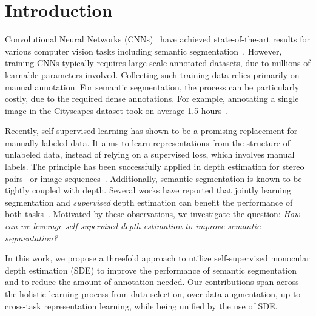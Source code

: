 \documentclass[final]{cvpr}
\begin{document}
 
\section{Introduction}
\label{sec:introduction}

Convolutional Neural Networks (CNNs)~\cite{lecun1998gradient} have achieved state-of-the-art results for various computer vision tasks including semantic segmentation~\cite{long2015fully, chen2017deeplab}. However, training CNNs typically requires large-scale annotated datasets, due to millions of learnable parameters involved. Collecting such training data relies primarily on manual annotation. For semantic segmentation, the process can be particularly costly, due to the required dense annotations. For example, annotating a single image in the Cityscapes dataset took on average 1.5 hours~\cite{cordts2016cityscapes}.

Recently, self-supervised learning has shown to be a promising replacement for manually labeled data. It aims to learn representations from the structure of unlabeled data, instead of relying on a supervised loss, which involves manual labels. The principle has been successfully applied in depth estimation for stereo pairs~\cite{godard2017unsupervised} or image sequences~\cite{zhou2017unsupervised}. 
Additionally, semantic segmentation is known to be tightly coupled with depth. Several works have reported that jointly learning segmentation and \textit{supervised} depth estimation can benefit the performance of both tasks~\cite{vandenhende2020revisiting}. 
Motivated by these observations, we investigate the question: \textit{How can we leverage self-supervised depth estimation to improve semantic segmentation?} 

In this work, we propose a threefold approach to utilize self-supervised monocular depth estimation (SDE) 
\cite{godard2017unsupervised, zhou2017unsupervised, godard2019digging} 
to improve the performance of semantic segmentation and to reduce the amount of annotation needed.
Our contributions span across the holistic learning process from data selection, over data augmentation, up to cross-task representation learning, while being unified by the use of SDE.
\end{document}
